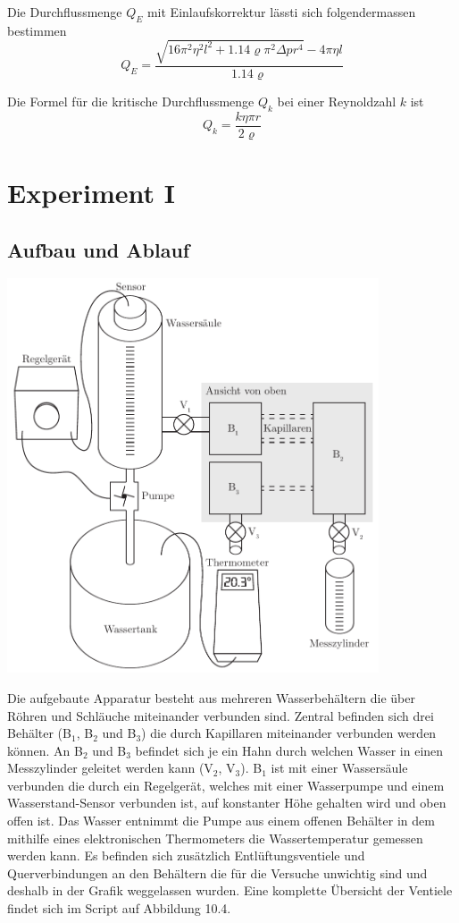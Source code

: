 \documentclass[12pt,a4paper]{article}
\newcommand{\subscript}[1]{$_{#1}$}
\newcommand{\B}[1]{B\subscript{#1}}
\newcommand{\V}[1]{V\subscript{#1}}
\begin{document}
Die Durchflussmenge $Q_{E}$ mit Einlaufskorrektur l\"assti sich folgendermassen bestimmen
\begin{equation}
Q_E = \frac{\sqrt{16\pi^2\eta^2l^2 + 1.14\varrho \pi^2 \Delta p r^4} - 4 \pi \eta l}{1.14 \varrho}
\end{equation}

Die Formel f\"ur die kritische Durchflussmenge $Q_{k}$ bei einer Reynoldzahl $k$ ist
\begin{equation}
Q_k = \frac{k\eta \pi r}{2\varrho}
\end{equation}

\section*{Experiment I}

\subsection*{Aufbau und Ablauf}
\begin{center}
\includegraphics[width=11cm]{illustration.pdf}
\end{center}

Die aufgebaute Apparatur besteht aus mehreren Wasserbeh\"altern die \"uber R\"ohren und Schl\"auche miteinander verbunden sind. Zentral befinden sich drei Beh\"alter (\B{1}, \B{2} und \B{3}) die durch Kapillaren miteinander verbunden werden k\"onnen. An \B{2} und \B{3} befindet sich je ein Hahn durch welchen Wasser in einen Messzylinder geleitet werden kann (\V{2}, \V{3}). \B{1} ist mit einer Wassers\"aule verbunden die durch ein Regelger\"at, welches mit einer Wasserpumpe und einem Wasserstand-Sensor verbunden ist, auf konstanter H\"ohe gehalten wird und oben offen ist. Das Wasser entnimmt die Pumpe aus einem offenen Beh\"alter in dem mithilfe eines elektronischen Thermometers die Wassertemperatur gemessen werden kann. Es befinden sich zusätzlich Entl\"uftungsventiele und Querverbindungen an den Beh\"altern die für die Versuche unwichtig sind und deshalb in der Grafik weggelassen wurden. Eine komplette \"Ubersicht der Ventiele findet sich im Script auf Abbildung 10.4.
\end{document}
